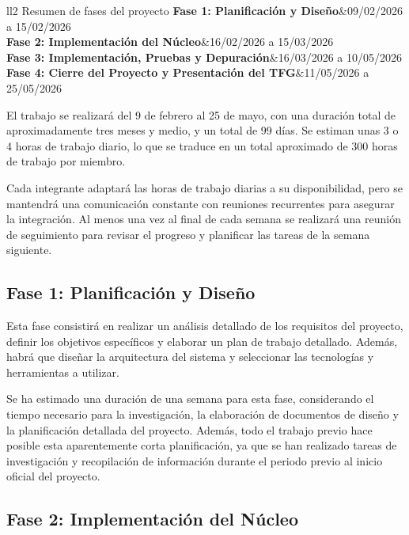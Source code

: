\begin{table}[htb]
	\centering
	\begin{coolTable}{ll}{2}
{Resumen de fases del proyecto}
	\textbf{Fase 1: Planificación y Diseño}&09/02/2026 a 15/02/2026\\
	\textbf{Fase 2: Implementación del Núcleo}&16/02/2026 a 15/03/2026\\
	\textbf{Fase 3: Implementación, Pruebas y Depuración}&16/03/2026 a 10/05/2026\\
	\textbf{Fase 4: Cierre del Proyecto y Presentación del TFG}&11/05/2026 a 25/05/2026\\
	\end{coolTable}
	\caption{Planificación temporal de fases del proyecto}
\end{table}

El trabajo se realizará del 9 de febrero al 25 de mayo, con una duración total de aproximadamente 
tres meses y medio, y un total de 99 días. Se estiman unas 3 o 4 horas de trabajo diario,
lo que se traduce en un total aproximado de 300 horas de trabajo por miembro. 

Cada integrante adaptará las horas de trabajo diarias a su disponibilidad, pero se mantendrá 
una comunicación constante con reuniones recurrentes para asegurar la integración. Al menos
una vez al final de cada semana se realizará una reunión de seguimiento para revisar el progreso y
planificar las tareas de la semana siguiente.

\subsection{Fase 1: Planificación y Diseño}

Esta fase consistirá en realizar un análisis detallado de los requisitos del proyecto, definir 
los objetivos específicos y elaborar un plan de trabajo detallado. Además, habrá que diseñar 
la arquitectura del sistema y seleccionar las tecnologías y herramientas a utilizar.

Se ha estimado una duración de una semana para esta fase, considerando el tiempo necesario para 
la investigación, la elaboración de documentos de diseño y la planificación detallada del proyecto.
Además, todo el trabajo previo hace posible esta aparentemente corta planificación, ya que se han realizado
tareas de investigación y recopilación de información durante el periodo previo al inicio oficial del proyecto.

\subsection{Fase 2: Implementación del Núcleo}


